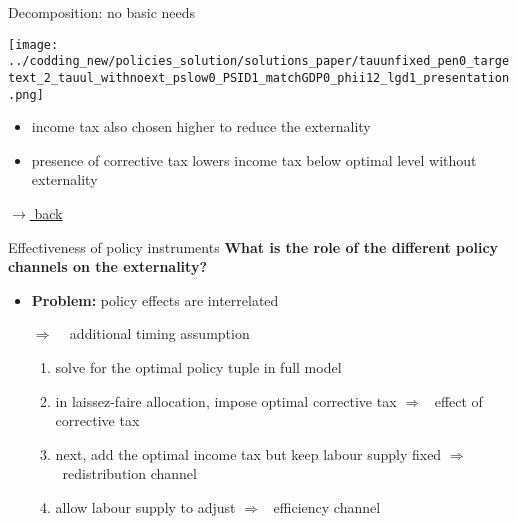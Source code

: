 \documentclass[11pt,aspectratio=169]{beamer}
\newcommand{\ar}{$\Rightarrow$ \ }
\begin{document}
	\begin{frame}{Decomposition: no basic needs}
		\vspace{3mm}
		\hypertarget{noBN}{}
		\centering
		\begin{minipage}[]{0.45\textwidth}
			\texttt{[image: ../codding\_new/policies\_solution/solutions\_paper/tauunfixed\_pen0\_targetext\_2\_tauul\_withnoext\_pslow0\_PSID1\_matchGDP0\_phii12\_lgd1\_presentation.png]}
		\end{minipage}
		\vspace{3mm}
		\begin{itemize} 
			\item income tax also chosen higher to reduce the externality
			\item presence of corrective tax lowers income tax below optimal level without externality 
		\end{itemize}
		\vspace{-7mm}
		\hfill	
		\hyperlink{backpe}{\tiny{$\rightarrow$ back}}		 
	\end{frame}	
	
	
	
	\begin{frame}{Effectiveness of policy instruments}
		\hypertarget{3exp}{}
		\alert{	\textbf{What is the role of the different policy channels on the externality?}}
		
		\vspace{3mm}
		\begin{itemize}
			\item \textbf{Problem:} policy effects are interrelated 
			\vspace{2mm}
			\item[\ar] additional timing assumption \\
			\vspace{2mm}
			\begin{enumerate}
				\item<2-> solve for the optimal policy tuple in full model
				\vspace{2mm}
				\item<3-> in laissez-faire allocation, impose optimal corrective tax \ar effect of corrective tax
				\vspace{2mm}
				\item<4-> next, add the optimal income tax but keep labour supply fixed \ar redistribution channel
				\vspace{2mm}
				\item<5-> allow labour supply to adjust \ar efficiency channel
			\end{enumerate}
		\end{itemize}
		
	\end{frame}
	
\end{document}
